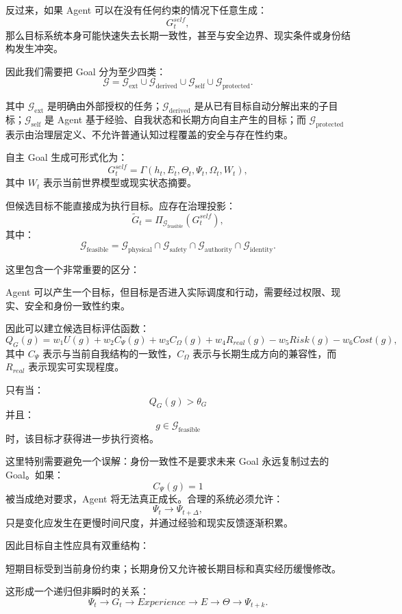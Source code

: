 反过来，如果 Agent 可以在没有任何约束的情况下任意生成：
\[
G_t^{self},
\]
那么目标系统本身可能快速失去长期一致性，甚至与安全边界、现实条件或身份结构发生冲突。

因此我们需要把 Goal 分为至少四类：
\[
\boxed{
\mathcal G
=
\mathcal G_{\mathrm{ext}}
\cup
\mathcal G_{\mathrm{derived}}
\cup
\mathcal G_{\mathrm{self}}
\cup
\mathcal G_{\mathrm{protected}}.
}
\]

其中 $\mathcal G_{\mathrm{ext}}$ 是明确由外部授权的任务；$\mathcal G_{\mathrm{derived}}$ 是从已有目标自动分解出来的子目标；$\mathcal G_{\mathrm{self}}$ 是 Agent 基于经验、自我状态和长期方向自主产生的目标；而 $\mathcal G_{\mathrm{protected}}$ 表示由治理层定义、不允许普通认知过程覆盖的安全与存在性约束。

自主 Goal 生成可形式化为：
\[
G_t^{self}
=
\Gamma(
h_t,
E_t,
\Theta_t,
\Psi_t,
\Omega_t,
W_t
),
\]
其中 $W_t$ 表示当前世界模型或现实状态摘要。

但候选目标不能直接成为执行目标。应存在治理投影：
\[
\tilde G_t
=
\Pi_{\mathcal G_{\mathrm{feasible}}}
(
G_t^{self}
),
\]
其中：
\[
\mathcal G_{\mathrm{feasible}}
=
\mathcal G_{\mathrm{physical}}
\cap
\mathcal G_{\mathrm{safety}}
\cap
\mathcal G_{\mathrm{authority}}
\cap
\mathcal G_{\mathrm{identity}}.
\]

这里包含一个非常重要的区分：
\begin{statementbox}
\centering
{}
\end{statementbox}
Agent 可以产生一个目标，但目标是否进入实际调度和行动，需要经过权限、现实、安全和身份一致性约束。

因此可以建立候选目标评估函数：
\[
Q_G(g)
=
w_1 U(g)
+
w_2 C_{\Psi}(g)
+
w_3 C_{\Omega}(g)
+
w_4 R_{real}(g)
-
w_5 Risk(g)
-
w_6 Cost(g),
\]
其中 $C_{\Psi}$ 表示与当前自我结构的一致性，$C_{\Omega}$ 表示与长期生成方向的兼容性，而 $R_{real}$ 表示现实可实现程度。

只有当：
\[
Q_G(g)
>
\theta_G
\]
并且：
\[
g\in
\mathcal G_{\mathrm{feasible}}
\]
时，该目标才获得进一步执行资格。

这里特别需要避免一个误解：身份一致性不是要求未来 Goal 永远复制过去的 Goal。如果：
\[
C_{\Psi}(g)=1
\]
被当成绝对要求，Agent 将无法真正成长。合理的系统必须允许：
\[
\Psi_t
\rightarrow
\Psi_{t+\Delta},
\]
只是变化应发生在更慢时间尺度，并通过经验和现实反馈逐渐积累。

因此目标自主性应具有双重结构：
\begin{statementbox}
短期目标受到当前身份约束；长期身份又允许被长期目标和真实经历缓慢修改。
\end{statementbox}
这形成一个递归但非瞬时的关系：
\[
\Psi_t
\rightarrow
G_t
\rightarrow
Experience
\rightarrow
E
\rightarrow
\Theta
\rightarrow
\Psi_{t+k}.
\]

